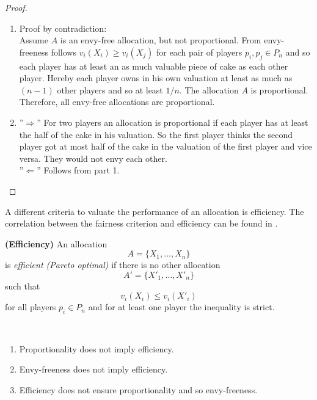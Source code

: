 \begin{proof}
\textcolor{white}{x}
\begin{enumerate}
\item Proof by contradiction:\\ Assume $A$ is an envy-free allocation, but not proportional. From envy-freeness follows $v_i(X_i) \geq v_i(X_j)$ for each pair of players $p_i, p_j \in P_n$ and so each player has at least an as much valuable piece of cake as each other player. Hereby each player owns in his own valuation at least as much as $(n-1)$ other players and so at least $1/n$. \blitza The allocation $A$ is proportional. %
\\Therefore, all envy-free allocations are proportional.
\item ''$\Rightarrow$'' For two players an allocation is proportional if each player has at least the half of the cake in his valuation. So the first player thinks the second player got at most half of the cake in the valuation of the first player and vice versa. They would not envy each other.\\ ''$\Leftarrow$'' Follows from part 1.\\
\end{enumerate}
\end{proof}
A different criteria to valuate the performance of an allocation is efficiency. The correlation between the fairness criterion and efficiency can be found in \cite{eff}. 
\begin{defi}{\textbf{(Efficiency)}}
\newline An allocation \[A=\{X_1,\dots, X_n\}\] is \emph{efficient (Pareto optimal)} if there is no other allocation \[A'=\{X'_1,\dots, X'_n\}\] such that \[v_i(X_i)\leq v_i(X'_i)\] for all players $p_i \in P_n$ and for at least one player the inequality is strict.
\end{defi}
%
\begin{lem}
\textcolor{white}{x}
	\begin{enumerate}
		\item Proportionality does not imply efficiency.
		\item Envy-freeness does not imply efficiency.
		\item Efficiency does not ensure proportionality and so envy-freeness.
	\end{enumerate}
\end{lem}

